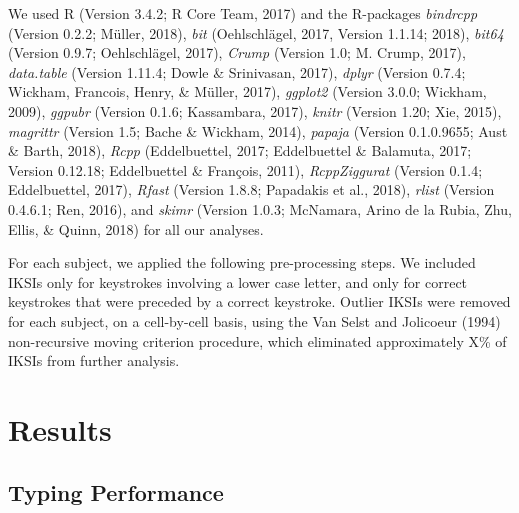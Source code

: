 \documentclass[floatsintext,man]{apa6}
\theoremstyle{definition}
\theoremstyle{definition}
\theoremstyle{definition}
\theoremstyle{remark}
\begin{document}
We used R (Version 3.4.2; R Core Team, 2017) and the R-packages
\emph{bindrcpp} (Version 0.2.2; Müller, 2018), \emph{bit} (Oehlschlägel,
2017, Version 1.1.14; 2018), \emph{bit64} (Version 0.9.7; Oehlschlägel,
2017), \emph{Crump} (Version 1.0; M. Crump, 2017), \emph{data.table}
(Version 1.11.4; Dowle \& Srinivasan, 2017), \emph{dplyr} (Version
0.7.4; Wickham, Francois, Henry, \& Müller, 2017), \emph{ggplot2}
(Version 3.0.0; Wickham, 2009), \emph{ggpubr} (Version 0.1.6;
Kassambara, 2017), \emph{knitr} (Version 1.20; Xie, 2015),
\emph{magrittr} (Version 1.5; Bache \& Wickham, 2014), \emph{papaja}
(Version 0.1.0.9655; Aust \& Barth, 2018), \emph{Rcpp} (Eddelbuettel,
2017; Eddelbuettel \& Balamuta, 2017; Version 0.12.18; Eddelbuettel \&
François, 2011), \emph{RcppZiggurat} (Version 0.1.4; Eddelbuettel,
2017), \emph{Rfast} (Version 1.8.8; Papadakis et al., 2018),
\emph{rlist} (Version 0.4.6.1; Ren, 2016), and \emph{skimr} (Version
1.0.3; McNamara, Arino de la Rubia, Zhu, Ellis, \& Quinn, 2018) for all
our analyses.

For each subject, we applied the following pre-processing steps. We
included IKSIs only for keystrokes involving a lower case letter, and
only for correct keystrokes that were preceded by a correct keystroke.
Outlier IKSIs were removed for each subject, on a cell-by-cell basis,
using the Van Selst and Jolicoeur (1994) non-recursive moving criterion
procedure, which eliminated approximately X\% of IKSIs from further
analysis.

\section{Results}\label{results}

\subsection{Typing Performance}\label{typing-performance}
\end{document}
